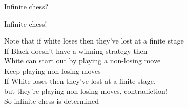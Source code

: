 \documentclass{beamer}
\begin{document}
\begin{frame}{Infinite chess?}
	\begin{center}
	\end{center}
\end{frame}

\begin{frame}{Infinite chess!}
	\begin{center}
		Note that if white loses then they've lost at a \alert<1>{finite} stage\\\vspace{.4cm}
		\pause If Black doesn't have a winning strategy then\\ White can start out by playing a \alert<2>{non-losing move}\\\vspace{.4cm}
		\pause Keep playing non-losing moves\\\vspace{.4cm}
		\pause If White loses then they've lost at a finite stage,\\ but they're playing non-losing moves, \alert<4>{contradiction!}\\\vspace{.4cm}
		\pause So \alert<5>{infinite chess is determined}
	\end{center}
\end{frame}
\end{document}
